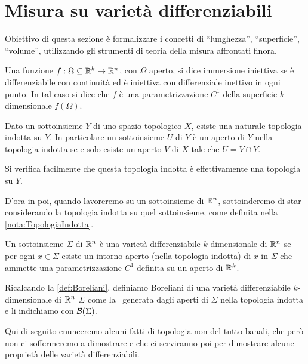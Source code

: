 \section{Misura su varietà differenziabili}
Obiettivo di questa sezione è formalizzare i concetti di ``lunghezza'', ``superficie'', ``volume'', utilizzando gli strumenti di teoria della misura affrontati finora. 

\begin{definition}
	Una funzione $f:\Omega \subseteq \mathbb R^k\to\mathbb R^n$, con $\Omega$ aperto, si dice immersione iniettiva se è differenziabile con continuità ed è iniettiva con differenziale inettivo in ogni punto. In tal caso si dice che $f$ è una parametrizzazione $C^1$ della superficie $k$-dimensionale $f(\Omega)$.
\end{definition}

\begin{remark}\label{nota:TopologiaIndotta}
	Dato un sottoinsieme $Y$ di uno spazio topologico $X$, esiste una naturale topologia indotta su $Y$. In particolare un sottoinsieme $U$ di $Y$ è un aperto di $Y$ nella topologia indotta se e solo esiste un aperto $V$ di $X$ tale che $U=V\cap Y$. 
	
	Si verifica facilmente che questa topologia indotta è effettivamente una topologia su $Y$.
\end{remark}

D'ora in poi, quando lavoreremo su un sottoinsieme di $\mathbb R^n$, sottoinderemo di star considerando la topologia indotta su quel sottoinsieme, come definita nella \cref{nota:TopologiaIndotta}.

\begin{definition}
	Un sottoinsieme $\Sigma$ di $\mathbb R^n$ è una varietà differenziabile $k$-dimensionale di $\mathbb R^n$ se per ogni $x\in\Sigma$ esiste un intorno aperto (nella topologia indotta) di $x$ in $\Sigma$ che ammette una parametrizzazione $C^1$ definita su un aperto di $\mathbb R^k$.
\end{definition}

\begin{definition}\label{def:BorelianiVarieta}
	Ricalcando la \cref{def:Boreliani}, definiamo Boreliani di una varietà differenziabile $k$-dimensionale di $\mathbb R^n$ $\Sigma$ come la \sigalg\ generata dagli aperti di $\Sigma$ nella topologia indotta e li indichiamo con $\mathcal B(\Sigma)$.
\end{definition}

Qui di seguito enunceremo alcuni fatti di topologia non del tutto banali, che però non ci soffermeremo a dimostrare e che ci serviranno poi per dimostrare alcune proprietà delle varietà differenziabili.

